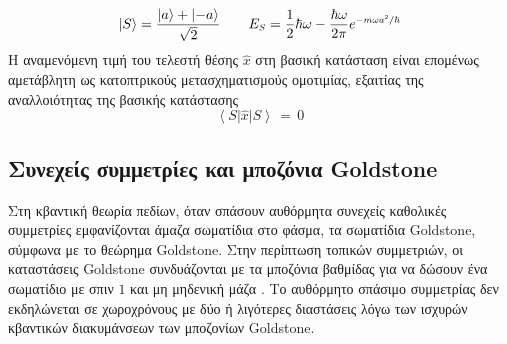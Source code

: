 \begin{equation}
    \left|S\right>=\frac{\left|a\right>+\left|-a\right>}{\sqrt{2}}\qquad E\subscr{S}=\frac{1}{2}\hbar\omega-\frac{\hbar\omega}{2\pi}e\superscr{-m\omega a\superscr{2}/\hbar}
\end{equation}
Η αναμενόμενη τιμή του τελεστή θέσης $\hat{x}$ στη βασική κατάσταση είναι επομένως αμετάβλητη ως κατοπτρικούς  μετασχηματισμούς ομοτιμίας, εξαιτίας της αναλλοιότητας της βασικής κατάστασης
\begin{equation}
    \left<S\right| \hat{x} \left|S\right>\,=\,0
\end{equation}

\subsection{Συνεχείς συμμετρίες και μποζόνια Goldstone}
Στη κβαντική θεωρία πεδίων, όταν σπάσουν αυθόρμητα συνεχείς καθολικές συμμετρίες 
εμφανίζονται άμαζα σωματίδια στο φάσμα, τα σωματίδια Goldstone, σύμφωνα με το θεώρημα Goldstone. Στην περίπτωση τοπικών  συμμετριών, οι καταστάσεις Goldstone συνδυάζονται με τα μποζόνια βαθμίδας για να δώσουν ένα σωματίδιο με σπιν $1$ και μη μηδενική μάζα \cite{Peskin:1995ev}.  
Tο αυθόρμητο
σπάσιμο συμμετρίας δεν εκδηλώνεται σε χωροχρόνους με δύο ή λιγότερες διαστάσεις λόγω των ισχυρών κβαντικών διακυμάνσεων των μποζονίων Goldstone. 

